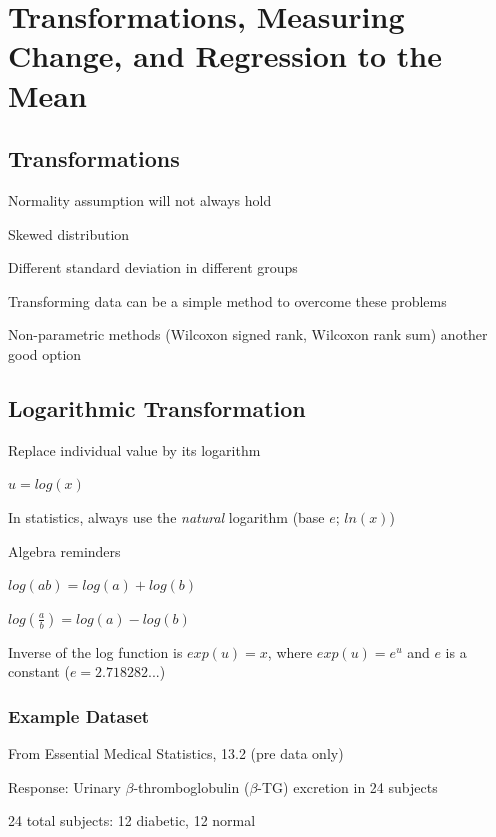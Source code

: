 

\chapter{Transformations, Measuring Change, and Regression to the Mean}

\section{Transformations}

\bi
 \item Normality assumption will not always hold
 \bi
  \item Skewed distribution
  \item Different standard deviation in different groups
 \ei
 \item Transforming data can be a simple method to overcome these problems
 \item Non-parametric methods (Wilcoxon signed rank, Wilcoxon rank
   sum) another good option
\ei


\section{Logarithmic Transformation}

\bi
\item Replace individual value by its logarithm
  \bi
   \item $u = log(x)$
  \ei
\item In statistics, always use the \textit{natural} logarithm (base
  $e$; $ln(x)$)
\item Algebra reminders
  \bi
  \item $log(ab) = log(a) + log(b)$
  \item $log\left(\frac{a}{b}\right) = log(a) - log(b)$
  \item Inverse of the log function is $exp(u) = x$, where $exp(u) =
    e^{u}$ and $e$ is a constant ($e = 2.718282 ...$)
  \ei
\ei

\subsection{Example Dataset}

\bi
  \item From Essential Medical Statistics, 13.2 (pre data only)
  \item Response: Urinary $\beta$-thromboglobulin ($\beta$-TG)
    excretion in 24 subjects
  \item 24 total subjects: 12 diabetic, 12 normal
\ei

